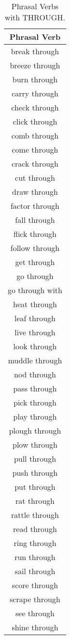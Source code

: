 
\begin{longtable}{c}
\caption{Phrasal Verbs with THROUGH.} \label{a:through} \\
\midrule
\toprule 
\textbf{Phrasal Verb} \\
\midrule
break through \\
breeze through \\
burn through \\
carry through \\
check through \\
click through \\
comb through \\
come through \\
crack through \\
cut through \\
draw through \\
factor through \\
fall through \\
flick through \\
follow through \\
get through \\
go through \\
go through with \\
heat through \\
leaf through \\
live through \\
look through \\
muddle through \\
nod through \\
pass through \\
pick through \\
play through \\
plough through \\
plow through \\
pull through \\
push through \\
put through \\
rat through \\
rattle through \\
read through \\
ring through \\
run through \\
sail through \\
score through \\
scrape through \\
see through \\
shine through \\

\end{longtable}
